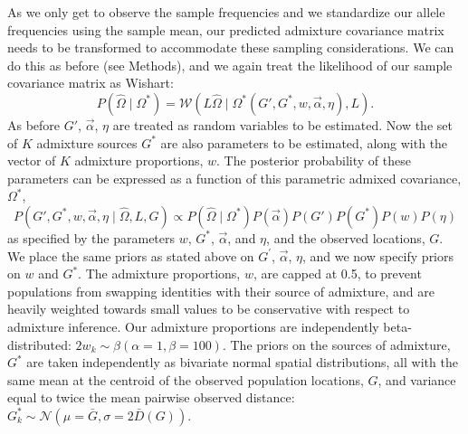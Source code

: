 \documentclass[12pt]{article}
\newcommand{\identifyadmixsource}[1]{{#1^{*}}}
\begin{document}
As we only get to observe the sample frequencies and we standardize our allele frequencies using the sample mean, our predicted admixture covariance matrix needs to be transformed to accommodate these sampling considerations. We can do this as before (see Methods), and we again treat the likelihood of our sample covariance matrix as Wishart:
\begin{equation}
\label{eq:wishart_dist_admixed}
P(\widehat{\Omega} \mid \identifyadmixsource{\Omega}) = 
	\mathcal{W}\left(L \widehat{\Omega} \mid \identifyadmixsource{\Omega} \left( G',\identifyadmixsource{G}, w,\vec{\alpha},\eta \right),L \right)	\text{.}
\end{equation}
As before $G'$, $\vec{\alpha}$, $\eta$ are treated as random variables to be estimated. Now the set of $K$ admixture sources $\identifyadmixsource{G}$ are also parameters to be estimated, along with the vector of $K$ admixture proportions, $w$. The posterior probability of these parameters can be expressed as a function of this parametric admixed covariance, $\identifyadmixsource{\Omega}$,
\begin{equation}
\label{eq:admixed_post_prob}
P(G',\identifyadmixsource{G}, w,\vec{\alpha}, \eta \mid \widehat{\Omega}, L,G) 
	\propto  
		P(\widehat{\Omega}  \mid \identifyadmixsource{\Omega}) P(\vec{\alpha}) P(G') P(\identifyadmixsource{G}) P(w) P(\eta) 
\end{equation}
%
as specified by the parameters $w$, $\identifyadmixsource{G}$, $\vec{\alpha}$, and $\eta$, and the observed locations, $G$.  We place the same priors as stated above on $G^{\prime}$, $\vec{\alpha}$, $\eta$, and we now specify priors on $w$ and $\identifyadmixsource{G}$.  The admixture proportions, $w$, are capped at 0.5, to prevent populations from swapping identities with their source of admixture, and are heavily weighted towards small values to be conservative with respect to admixture inference.  Our admixture proportions are independently beta-distributed: $2 w_k \sim \beta(\alpha = 1,\beta = 100)$.  The priors on the sources of admixture, $\identifyadmixsource{G}$ are taken independently as bivariate normal spatial distributions, all with the same mean at the centroid of the observed population locations, $G$, and variance equal to twice the mean pairwise observed distance:  $\identifyadmixsource{G_k} \sim \mathcal{N}(\mu = \bar{G},\sigma = 2 \bar{D}(G))$.
\end{document}
